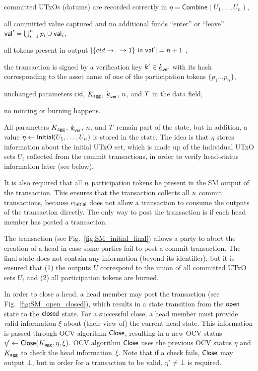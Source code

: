 \begin{menumerate}
  \item committed UTxOs (datums) are recorded correctly in
  $\eta = \mathsf{Combine}(U_{1}, \ldots, U_{n})$,
  \item all committed value captured and no additional funds ``enter'' or ``leave''
  $\mathsf{val}' = \bigcup_{i=1}^{n} p_{i} \cup \mathsf{val}_{i}$,
  \item all tokens present in output
  $|\{cid \rightarrow . \rightarrow 1\} ~ \mathsf{in} ~ \mathsf{val}'| = n + 1$
  ,
  \item the transaction is signed by a verification key $k' \in \underline{k}_{\mathsf{ver}}$ with its
  hash corresponding to the asset name of one of the participation tokens
  $\{p_1 \dots p_n\}$,
  \item unchanged parameters $\mathsf{cid}$, $K_{\mathsf{agg}}$, $\underline{k}_{\mathsf{ver}}$, $n$, and
  $T$ in the data field,
  \item no minting or burning happens.
\end{menumerate}

All parameters $K_{\mathsf{agg}}$, $\underline{k}_{\mathsf{ver}}$, $n$, and $T$ remain part of the state,
but in addition, a value $\eta \gets \mathsf{Initial}(U_1,\ldots,U_n)$ is stored in
the state. The idea is that $\eta$ stores information about the initial UTxO
set, which is made up of the individual UTxO sets $U_i$ collected from the
commit transactions, in order to verify head-status information later (see
below).

It is also required that all $n$ participation tokens be present in the SM
output of the \mtxCollect{} transaction. This ensures that the \mtxCollect{}
transaction collects all $n$ commit transactions, because $\nu_\mathsf{initial}$ does
not allow a \mtxCollect{} transaction to consume the outputs of the \mtxInit{}
transaction directly. The only way to post the \mtxCollect{} transaction is if
each head member has posted a \mtxCommit{} transaction.


 The \mtxAbort{} transaction
(see Fig.~\ref{fig:SM_initial_final}) allows a party to abort the
creation of a head in case some parties fail to post a commit
transaction.  The final state does not contain any information (beyond
its identifier), but it is ensured that (1) the outputs $U$ correspond
to the union of all committed UTxO sets $U_i$ and (2) all
participation tokens are burned.





 In order to close a head, a head
member may post the \mtxClose{} transaction (see
Fig.~\ref{fig:SM_open_closed}), which results in a state transition
from the $\mathsf{open}$ state to the $\mathsf{closed}$ state.  For a successful
close, a head member must provide valid information $\xi$ about (their
view of) the current head state.  This information is passed through
OCV algorithm $\mathsf{Close}$, resulting in a new OCV status
$\eta' \gets \mathsf{Close}(K_{\mathsf{agg}},\eta,\xi)$.  OCV algorithm $\mathsf{Close}$
uses the previous OCV status $\eta$ and $K_{\mathsf{agg}}$ to check the head
information~$\xi$.  Note that if a check fails, $\mathsf{Close}$ may output
$\bot$, but in order for a \mtxClose{} transaction to be valid,
$\eta' \neq \bot$ is required.

